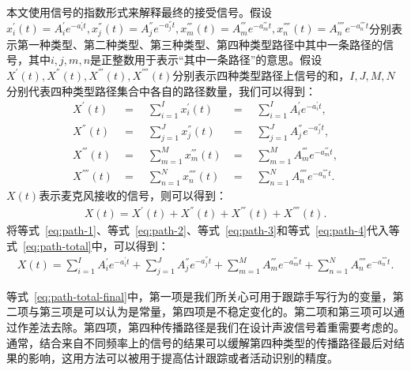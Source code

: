 本文使用信号的指数形式来解释最终的接受信号。假设$x_{i}^{'}(t)=A_{i}^{'}e^{-a_{i}^{'}t},x_{j}^{''}(t)=A_{j}^{''}e^{-a_{j}^{''}t},x_{m}^{'''}(t)=A_{m}^{'''}e^{-a_{m}^{'''}t},x_{n}^{''''}(t)=A_{n}^{''''}e^{-a_{n}^{''''}t}$分别表示第一种类型、第二种类型、第三种类型、第四种类型路径中其中一条路径的信号，其中$i,j,m,n$是正整数用于表示“其中一条路径”的意思。假设$X^{'}(t),X^{''}(t),X^{'''}(t),X^{''''}(t)$分别表示四种类型路径上信号的和，$I,J,M,N$分别代表四种类型路径集合中各自的路径数量，我们可以得到：
\begin{eqnarray}
X^{'}(t) &=\quad  \sum_{i=1}^{I}x_{i}^{'}(t)      &=\quad   \sum_{i=1}^{I}A_{i}^{'}e^{-a_{i}^{'}t}, \\ \label{eq:path-1}
X^{''}(t) &=\quad  \sum_{j=1}^{J}x_{j}^{''}(t)     &=\quad  \sum_{j=1}^{J}A_{j}^{''}e^{-a_{j}^{''}t}, \\ \label{eq:path-2}
X^{'''}(t) &=\quad   \sum_{m=1}^{M}x_{m}^{'''}(t)    &=\quad   \sum_{m=1}^{M}A_{m}^{'''}e^{-a_{m}^{'''}t} ,\\ \label{eq:path-3}
X^{''''}(t) &=\quad   \sum_{n=1}^{N}x_{n}^{''''}(t)  &=\quad   \sum_{n=1}^{N}A_{n}^{''''}e^{-a_{n}^{''''}t}. \label{eq:path-4}
\end{eqnarray}
$X(t)$表示麦克风接收的信号，则可以得到：
\begin{equation}
\begin{aligned}
X(t)=X^{'}(t) + X^{''}(t) + X^{'''}(t)+ X^{''''}(t). \label{eq:path-total}
\end{aligned}
\end{equation}
将等式~\ref{eq:path-1}、等式~\ref{eq:path-2}、等式~\ref{eq:path-3}和等式~\ref{eq:path-4}代入等式~\ref{eq:path-total}中，可以得到：
\begin{equation}
\begin{aligned}
X(t)=\sum_{i=1}^{I}A_{i}^{'}e^{-a_{i}^{'}t} + \sum_{j=1}^{J}A_{j}^{''}e^{-a_{j}^{''}t} +\sum_{m=1}^{M}A_{m}^{'''}e^{-a_{m}^{'''}t}+ \sum_{n=1}^{N}A_{n}^{''''}e^{-a_{n}^{''''}t}. \label{eq:path-total-final}
\end{aligned}
\end{equation}

等式~\ref{eq:path-total-final}中，第一项是我们所关心可用于跟踪手写行为的变量，第二项与第三项是可以认为是常量，第四项是不稳定变化的。第二项和第三项可以通过作差法去除。第四项，第四种传播路径是我们在设计声波信号着重需要考虑的。通常，结合来自不同频率上的信号的结果可以缓解第四种类型的传播路径最后对结果的影响，这用方法可以被用于提高估计跟踪或者活动识别的精度。

